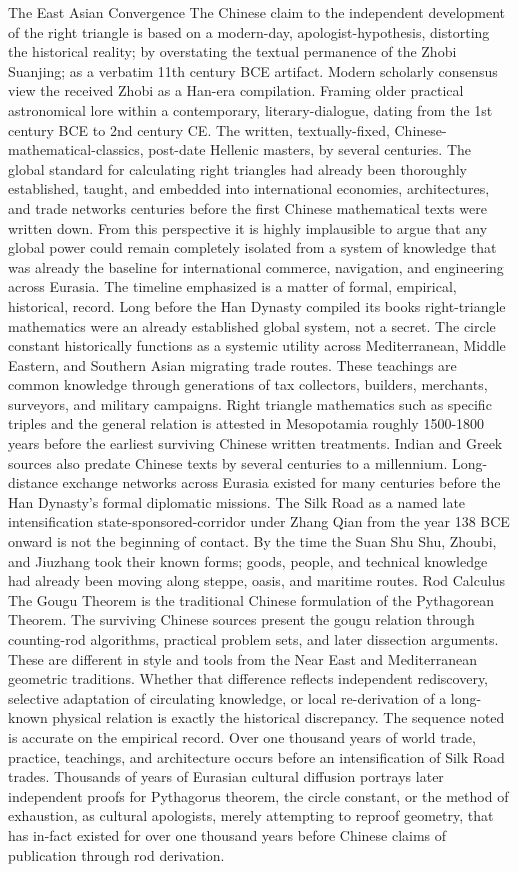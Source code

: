 {The East Asian Convergence
The Chinese claim to the independent development of the right triangle is based on a modern-day, apologist-hypothesis, distorting the historical reality; by overstating the textual permanence of the Zhobi Suanjing; as a verbatim 11th century BCE artifact. Modern scholarly consensus view the received Zhobi as a Han-era compilation. Framing older practical astronomical lore within a contemporary, literary-dialogue, dating from the 1st century BCE to 2nd century CE. The written, textually-fixed, Chinese-mathematical-classics, post-date Hellenic masters, by several centuries. The global standard for calculating right triangles had already been thoroughly established, taught, and embedded into international economies, architectures, and trade networks centuries before the first Chinese mathematical texts were written down.  
From this perspective it is highly implausible to argue that any global power could remain completely isolated from a system of knowledge that was already the baseline for international commerce, navigation, and engineering across Eurasia. The timeline emphasized is a matter of formal, empirical, historical, record. Long before the Han Dynasty compiled its books right-triangle mathematics were an already established global system, not a secret. The circle constant historically functions as a systemic utility across Mediterranean, Middle Eastern, and Southern Asian migrating trade routes. These teachings are common knowledge through generations of tax collectors, builders, merchants, surveyors, and military campaigns. Right triangle mathematics such as specific triples and the general relation is attested in Mesopotamia roughly 1500-1800 years before the earliest surviving Chinese written treatments. Indian and Greek sources also predate Chinese texts by several centuries to a millennium. Long-distance exchange networks across Eurasia existed for many centuries before the Han Dynasty’s formal diplomatic missions. The Silk Road as a named late intensification state-sponsored-corridor under Zhang Qian from the year 138 BCE onward is not the beginning of contact. By the time the Suan Shu Shu, Zhoubi, and Jiuzhang took their known forms; goods, people, and technical knowledge had already been moving along steppe, oasis, and maritime routes.
Rod Calculus
The Gougu Theorem is the traditional Chinese formulation of the Pythagorean Theorem. The surviving Chinese sources present the gougu relation through counting-rod algorithms, practical problem sets, and later dissection arguments. These are different in style and tools from the Near East and Mediterranean geometric traditions. Whether that difference reflects independent rediscovery, selective adaptation of circulating knowledge, or local re-derivation of a long-known physical relation is exactly the historical discrepancy. The sequence noted is accurate on the empirical record. Over one thousand years of world trade, practice, teachings, and architecture occurs before an intensification of Silk Road trades. Thousands of years of Eurasian cultural diffusion portrays later independent proofs for Pythagorus theorem, the circle constant, or the method of exhaustion, as cultural apologists, merely attempting to reproof geometry, that has in-fact existed for over one thousand years before Chinese claims of publication through rod derivation. 
}
